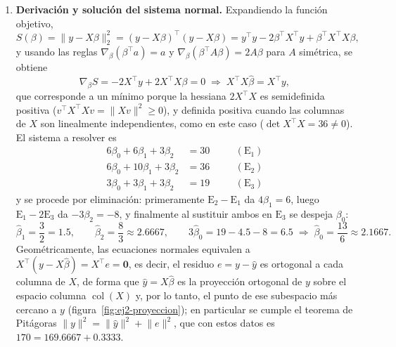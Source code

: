 \begin{enumerate}
\item \textbf{Derivación y solución del sistema normal.}
Expandiendo la función objetivo,
\[
    S(\beta) = \lVert y-X\beta\rVert_2^2 = (y-X\beta)^\top(y-X\beta)
    = y^\top y - 2\beta^\top X^\top y + \beta^\top X^\top X\beta ,
\]
y usando las reglas $\nabla_\beta(\beta^\top a)=a$ y
$\nabla_\beta(\beta^\top A\beta)=2A\beta$ para $A$ simétrica, se obtiene
\[
    \nabla_\beta S = -2X^\top y + 2X^\top X\beta = 0
    \;\Longrightarrow\;
    X^\top X\hat\beta = X^\top y ,
\]
que corresponde a un mínimo porque la hessiana $2X^\top X$ es semidefinida
positiva ($v^\top X^\top Xv=\lVert Xv\rVert^2\ge0$), y definida positiva
cuando las columnas de $X$ son linealmente independientes, como en este
caso ($\det X^\top X=36\neq0$). El sistema a resolver es
\[
    \begin{aligned}
        6\beta_0 + 6\beta_1 + 3\beta_2 &= 30 &\quad&(\mathrm{E}_1)\\
        6\beta_0 + 10\beta_1 + 3\beta_2 &= 36 &&(\mathrm{E}_2)\\
        3\beta_0 + 3\beta_1 + 3\beta_2 &= 19 &&(\mathrm{E}_3)
    \end{aligned}
\]
y se procede por eliminación: primeramente $\mathrm{E}_2-\mathrm{E}_1$
da $4\beta_1=6$, luego $\mathrm{E}_1-2\mathrm{E}_3$ da $-3\beta_2=-8$, y
finalmente al sustituir ambos en $\mathrm{E}_3$ se despeja $\beta_0$:
\[
    \hat\beta_1 = \frac{3}{2} = 1.5, \qquad
    \hat\beta_2 = \frac{8}{3} \approx 2.6667, \qquad
    3\hat\beta_0 = 19 - 4.5 - 8 = 6.5
    \;\Rightarrow\; \hat\beta_0 = \frac{13}{6} \approx 2.1667 .
\]
Geométricamente, las ecuaciones normales equivalen a
$X^\top(y-X\hat\beta)=X^\top e=\mathbf{0}$, es decir, el residuo
$e=y-\hat y$ es ortogonal a cada columna de $X$, de forma que
$\hat y=X\hat\beta$ es la proyección ortogonal de $y$ sobre el espacio
columna $\operatorname{col}(X)$ y, por lo tanto, el punto de ese
subespacio más cercano a $y$ (figura~\ref{fig:ej2-proyeccion}); en
particular se cumple el teorema de Pitágoras
$\lVert y\rVert^2=\lVert\hat y\rVert^2+\lVert e\rVert^2$, que con estos
datos es $170=169.6667+0.3333$.


\end{enumerate}
